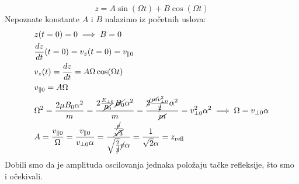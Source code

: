 \documentclass[fleqn]{report}
\begin{document}
\begin{enumerate}
\begin{enumerate}
                    \[ z = A\sin(\Omega t) + B\cos(\Omega t) \]
                    Nepoznate konstante $A$ i $B$ nalazimo iz početnih uslova:
                    \begin{align*}
                         & z(t = 0) = 0 \implies B = 0                                                                                                                                                                                                                                \\
                         & \frac{dz}{dt}(t = 0) = v_z(t = 0) = v_{\parallel 0}                                                                                                                                                                                                        \\
                         & v_z(t) = \frac{dz}{dt} = A\Omega\cos(\Omega t)                                                                                                                                                                                                             \\
                         & v_{\parallel 0} = A\Omega                                                                                                                                                                                                                                  \\
                         & \Omega^2 = \frac{2\mu B_0 \alpha^2}{m} = \frac{2 \frac{E_{\perp 0}}{\cancel{B_0}} \cancel{B_0} \alpha^2}{m} = \frac{\cancel 2 \frac{\cancel m v_{\perp 0}^2}{\cancel{2}} \alpha^2}{\cancel m} = v_{\perp 0}^2 \alpha^2 \implies \Omega = v_{\perp 0}\alpha \\
                         & A = \frac{v_{\parallel 0}}{\Omega} = \frac{v_{\parallel 0}}{v_{\perp 0} \alpha} = \frac{\frac{\cancel{v}}{\cancel{\sqrt3}}}{\sqrt{\frac{2}{\cancel 3}} \cancel v \alpha} = \frac{1}{\sqrt 2 \alpha} = z_\text{refl}
                    \end{align*}
                    Dobili smo da je amplituda oscilovanja jednaka položaju tačke refleksije, što smo i očekivali.
          \end{enumerate}
\end{enumerate}
\end{document}
